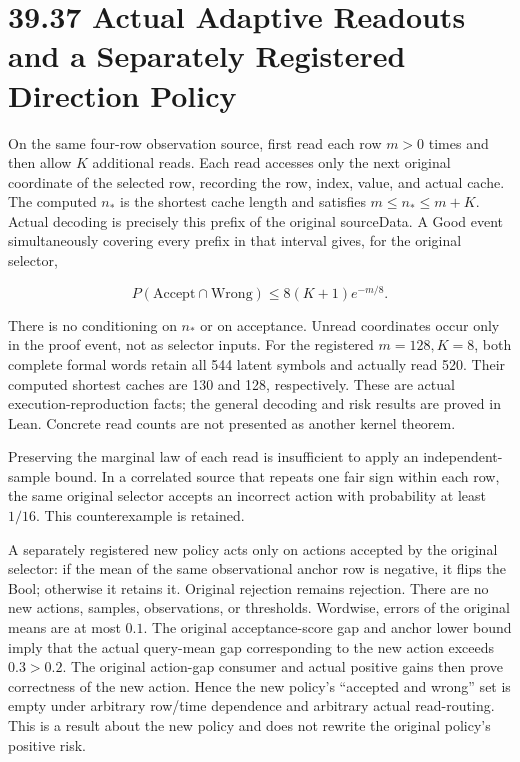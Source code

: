 \documentclass[
  english,
  11pt,
  oneside]{book}
\begin{document}
\section{39.37 Actual Adaptive Readouts and a Separately Registered Direction Policy}\label{actual-adaptive-readouts-and-a-separately-registered-direction-policy}

On the same four-row observation source, first read each row \(m>0\) times and then allow \(K\) additional reads. Each read accesses only the next original coordinate of the selected row, recording the row, index, value, and actual cache. The computed \(n_*\) is the shortest cache length and satisfies \(m\le n_*\le m+K\). Actual decoding is precisely this prefix of the original sourceData. A Good event simultaneously covering every prefix in that interval gives, for the original selector,

\[P(\mathrm{Accept}\cap\mathrm{Wrong})\le8(K+1)e^{-m/8}.\]

There is no conditioning on \(n_*\) or on acceptance. Unread coordinates occur only in the proof event, not as selector inputs. For the registered \(m=128,K=8\), both complete formal words retain all 544 latent symbols and actually read 520. Their computed shortest caches are 130 and 128, respectively. These are actual execution-reproduction facts; the general decoding and risk results are proved in Lean. Concrete read counts are not presented as another kernel theorem.

Preserving the marginal law of each read is insufficient to apply an independent-sample bound. In a correlated source that repeats one fair sign within each row, the same original selector accepts an incorrect action with probability at least \(1/16\). This counterexample is retained.

A separately registered new policy acts only on actions accepted by the original selector: if the mean of the same observational anchor row is negative, it flips the Bool; otherwise it retains it. Original rejection remains rejection. There are no new actions, samples, observations, or thresholds. Wordwise, errors of the original means are at most \(0.1\). The original acceptance-score gap and anchor lower bound imply that the actual query-mean gap corresponding to the new action exceeds \(0.3>0.2\). The original action-gap consumer and actual positive gains then prove correctness of the new action. Hence the new policy's ``accepted and wrong'' set is empty under arbitrary row/time dependence and arbitrary actual read-routing. This is a result about the new policy and does not rewrite the original policy's positive risk.
\end{document}
